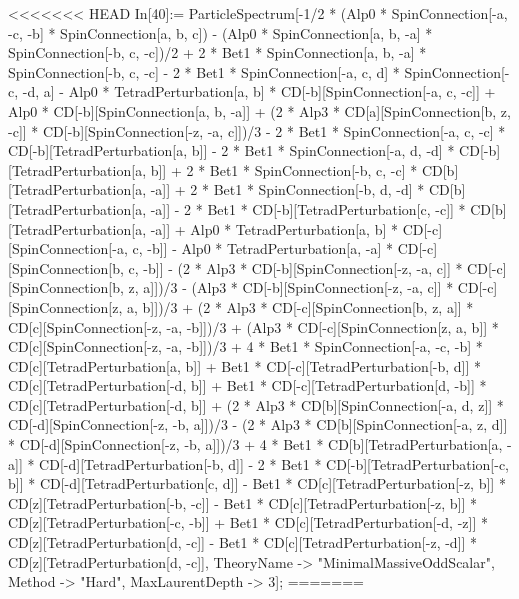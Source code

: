 <<<<<<< HEAD
In[40]:= ParticleSpectrum[-1/2 * (Alp0 * SpinConnection[-a, -c, -b] * SpinConnection[a, b, c]) - (Alp0 * SpinConnection[a, b, -a] * SpinConnection[-b, c, -c])/2 + 2 * Bet1 * SpinConnection[a, b, -a] * SpinConnection[-b, c, -c] - 2 * Bet1 * SpinConnection[-a, c, d] * SpinConnection[-c, -d, a] - Alp0 * TetradPerturbation[a, b] * CD[-b][SpinConnection[-a, c, -c]] + Alp0 * CD[-b][SpinConnection[a, b, -a]] + (2 * Alp3 * CD[a][SpinConnection[b, z, -c]] * CD[-b][SpinConnection[-z, -a, c]])/3 - 2 * Bet1 * SpinConnection[-a, c, -c] * CD[-b][TetradPerturbation[a, b]] - 2 * Bet1 * SpinConnection[-a, d, -d] * CD[-b][TetradPerturbation[a, b]] + 2 * Bet1 * SpinConnection[-b, c, -c] * CD[b][TetradPerturbation[a, -a]] + 2 * Bet1 * SpinConnection[-b, d, -d] * CD[b][TetradPerturbation[a, -a]] - 2 * Bet1 * CD[-b][TetradPerturbation[c, -c]] * CD[b][TetradPerturbation[a, -a]] + Alp0 * TetradPerturbation[a, b] * CD[-c][SpinConnection[-a, c, -b]] - Alp0 * TetradPerturbation[a, -a] * CD[-c][SpinConnection[b, c, -b]] - (2 * Alp3 * CD[-b][SpinConnection[-z, -a, c]] * CD[-c][SpinConnection[b, z, a]])/3 - (Alp3 * CD[-b][SpinConnection[-z, -a, c]] * CD[-c][SpinConnection[z, a, b]])/3 + (2 * Alp3 * CD[-c][SpinConnection[b, z, a]] * CD[c][SpinConnection[-z, -a, -b]])/3 + (Alp3 * CD[-c][SpinConnection[z, a, b]] * CD[c][SpinConnection[-z, -a, -b]])/3 + 4 * Bet1 * SpinConnection[-a, -c, -b] * CD[c][TetradPerturbation[a, b]] + Bet1 * CD[-c][TetradPerturbation[-b, d]] * CD[c][TetradPerturbation[-d, b]] + Bet1 * CD[-c][TetradPerturbation[d, -b]] * CD[c][TetradPerturbation[-d, b]] + (2 * Alp3 * CD[b][SpinConnection[-a, d, z]] * CD[-d][SpinConnection[-z, -b, a]])/3 - (2 * Alp3 * CD[b][SpinConnection[-a, z, d]] * CD[-d][SpinConnection[-z, -b, a]])/3 + 4 * Bet1 * CD[b][TetradPerturbation[a, -a]] * CD[-d][TetradPerturbation[-b, d]] - 2 * Bet1 * CD[-b][TetradPerturbation[-c, b]] * CD[-d][TetradPerturbation[c, d]] - Bet1 * CD[c][TetradPerturbation[-z, b]] * CD[z][TetradPerturbation[-b, -c]] - Bet1 * CD[c][TetradPerturbation[-z, b]] * CD[z][TetradPerturbation[-c, -b]] + Bet1 * CD[c][TetradPerturbation[-d, -z]] * CD[z][TetradPerturbation[d, -c]] - Bet1 * CD[c][TetradPerturbation[-z, -d]] * CD[z][TetradPerturbation[d, -c]], TheoryName -> "MinimalMassiveOddScalar", Method -> "Hard", MaxLaurentDepth -> 3]; 
=======

